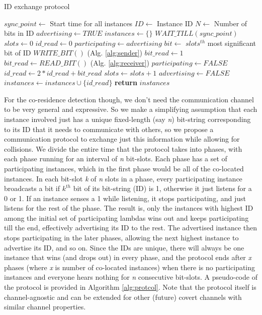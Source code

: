 \begin{algorithm}[!t]
\caption{ID exchange protocol }
\label{alg:protcol}
\begin{algorithmic}[1]
\STATE $sync\_point \leftarrow$ {Start time for all instances}
\STATE $ID \leftarrow$ {Instance ID}
\STATE $N \leftarrow$ {Number of bits in ID}
\STATE $advertising \leftarrow TRUE$
\STATE $instances \leftarrow \{\} $
\STATE $WAIT\_TILL(sync\_point)$
    \STATE $slots \leftarrow 0$
    \STATE $id\_read \leftarrow 0$
    \STATE $participating \leftarrow advertising$
        \STATE $bit \leftarrow$ {$slots^{th}$ most significant bit of ID}
            \STATE $WRITE\_BIT()$               (Alg. \ref{alg:sender})
            \STATE $bit\_read \leftarrow 1$
        \ELSE
            \STATE $bit\_read \leftarrow READ\_BIT()$       (Alg. \ref{alg:receiver})
                \STATE $participating \leftarrow FALSE$
            \ENDIF
        \ENDIF
        \STATE $id\_read \leftarrow 2 * id\_read + bit\_read$
        \STATE $slots \leftarrow slots + 1$
    \ENDWHILE
        \STATE $advertising \leftarrow FALSE$
    \ENDIF
    \STATE $instances \leftarrow instances \cup \{id\_read\}$
\ENDWHILE
\STATE \textbf{return} $instances$
\end{algorithmic}
\end{algorithm}

For the co-residence detection though, we don't need the communication channel to 
be very general and expressive. So we make a simplifying assumption that each instance 
involved just has a unique fixed-length (say \emph{n}) bit-string corresponding 
to its ID that it needs to communicate with others, so we propose a communication 
protocol to exchange just this information while allowing for collisions. We 
divide the entire time that the protocol takes into phases, with each phase running 
for an interval of
\textit{n} bit-slots. Each phase has a set of participating instances, 
which in the first phase would be all of the co-located instances. In each bit-slot
\textit{k} of \textit{n} slots in a phase, every participating instance broadcasts 
a bit if $k^{th}$ bit of its 
bit-string (ID) is 1, otherwise it just listens for a 0 or 1. If an instance senses a 1 
while listening, it stops participating, and just listens for the rest of the 
phase. The result is, only the instances with highest ID among the initial 
set of participating lambdas wins out and keeps participating till the end, 
effectively advertising its ID to the rest. The advertised instance then stops 
participating in the later phases, allowing the next highest instance to advertise its 
ID, and so on. Since the IDs are unique, there will always be one instance that 
wins (and drops out) in every phase, and the protocol ends after \textit{x} phases 
(where \textit{x} is number of co-located instances) when there is no participating 
instances and everyone hears nothing for \textit{n} consecutive bit-slots. A 
pseudo-code of the protocol is provided in Algorithm \ref{alg:protcol}. Note that 
the protocol itself is channel-agnostic and can be extended for other (future) covert 
channels with similar channel properties.

